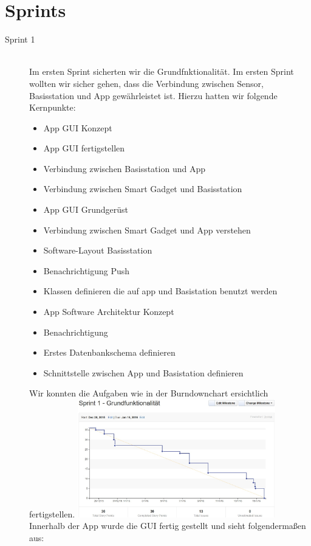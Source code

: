 \section{Sprints}
\begin{description}
	\item [Sprint 1] \hfill \\
	Im ersten Sprint sicherten wir die Grundfnktionalität. Im ersten Sprint wollten wir sicher gehen, dass die Verbindung zwischen Sensor, Basisstation und App gewährleistet ist. Hierzu hatten wir folgende Kernpunkte:
	\begin{itemize}		
		\item App GUI Konzept 
		\item App GUI fertigstellen
		\item Verbindung zwischen Basisstation und App
		\item Verbindung zwischen Smart Gadget und Basisstation
		\item App GUI Grundgerüst
		\item Verbindung zwischen Smart Gadget und App verstehen
		\item Software-Layout Basisstation
		\item Benachrichtigung Push
		\item Klassen definieren die auf app und Basistation benutzt werden
		\item App Software Architektur Konzept
		\item Benachrichtigung
		\item Erstes Datenbankschema definieren
		\item Schnittstelle zwischen App und Basistation definieren
	\end{itemize}
	Wir konnten die Aufgaben wie in der Burndownchart ersichtlich fertigstellen.
	\includegraphics[width=0.7\textwidth]{burndown_sprint1.jpg}
	Innerhalb der App wurde die GUI fertig gestellt und sieht folgendermaßen aus:

\end{description}
